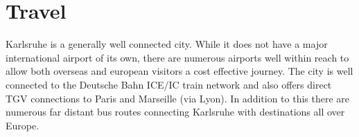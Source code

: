 
\newpage


\vspace*{5cm}

\section{Travel}

Karlsruhe is a generally well connected city. While it does not have a major
international airport of its own, there are numerous airports well within reach
to allow both overseas and european visitors a cost effective journey. The city
is well connected to the Deutsche Bahn ICE/IC train network and also offers
direct TGV connections to Paris and Marseille (via Lyon). In addition to this
there are numerous far distant bus routes connecting Karlsruhe with destinations
all over Europe.

